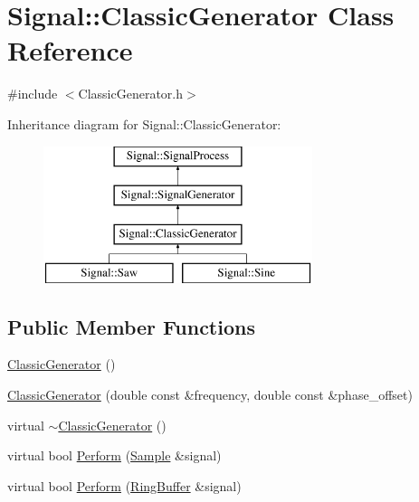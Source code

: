 \hypertarget{class_signal_1_1_classic_generator}{\section{Signal\+:\+:Classic\+Generator Class Reference}
\label{class_signal_1_1_classic_generator}
}


{\ttfamily \#include $<$Classic\+Generator.\+h$>$}

Inheritance diagram for Signal\+:\+:Classic\+Generator\+:\begin{figure}[H]
\begin{center}
\leavevmode
\includegraphics[height=4.000000cm]{class_signal_1_1_classic_generator}
\end{center}
\end{figure}
\subsection*{Public Member Functions}
\begin{DoxyCompactItemize}
\item 
\hyperlink{class_signal_1_1_classic_generator_a7e4478904de77156deccb1515f6985cb}{Classic\+Generator} ()
\item 
\hyperlink{class_signal_1_1_classic_generator_aa8e7631c9a4a72d42bbe560c02ed7358}{Classic\+Generator} (double const \&frequency, double const \&phase\+\_\+offset)
\item 
virtual \hyperlink{class_signal_1_1_classic_generator_a6659174adf402df341e3c0f94564fd37}{$\sim$\+Classic\+Generator} ()
\item 
virtual bool \hyperlink{class_signal_1_1_classic_generator_a4a62f329b9cd64d92b07f53c4d593356}{Perform} (\hyperlink{class_signal_1_1_sample}{Sample} \&signal)
\item 
virtual bool \hyperlink{class_signal_1_1_classic_generator_a308c13baa66020d44c2227bd58db4b4f}{Perform} (\hyperlink{class_signal_1_1_ring_buffer}{Ring\+Buffer} \&signal)
\end{DoxyCompactItemize}
